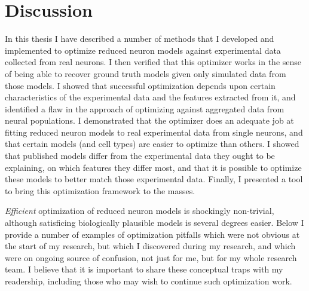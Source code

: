 \chapter{Discussion}
In this thesis I have described a number of methods that I developed and implemented to optimize reduced neuron models against experimental data collected from real neurons.
I then verified that this optimizer works in the sense of being able to recover ground truth models given only simulated data from those models.
I showed that successful optimization depends upon certain characteristics of the experimental data and the features extracted from it, and identified a flaw in the approach of optimizing against aggregated data from neural populations. 
I demonstrated that the optimizer does an adequate job at fitting reduced neuron models to real experimental data from single neurons, and that certain models (and cell types) are easier to optimize than others.
I showed that published models differ from the experimental data they ought to be explaining, on which features they differ most, and that it is possible to optimize these models to better match those experimental data.
Finally, I presented a tool to bring this optimization framework to the masses.

\emph{Efficient} optimization of reduced neuron models is shockingly non-trivial, although satisficing biologically plausible models is several degrees easier.
Below I provide a number of examples of optimization pitfalls which were not obvious at the start of my research, but which I discovered during my research, and which were on ongoing source of confusion, not just for me, but for my whole research team.
I believe that it is important to share these conceptual traps with my readership, including those who may wish to continue such optimization work.







